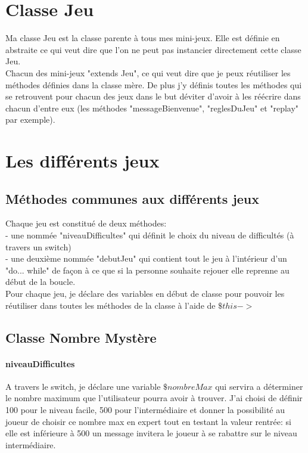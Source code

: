 \documentclass[10pt]{report}
\begin{document}
	\section{Classe Jeu}
		Ma classe Jeu est la classe parente à tous mes mini-jeux. Elle est définie en abstraite ce qui veut dire que l'on ne peut pas instancier directement cette classe Jeu.\\

		Chacun des mini-jeux "extends Jeu", ce qui veut dire que je peux réutiliser les méthodes définies dans la classe mère. De plus j'y définis toutes les méthodes qui se retrouvent pour chacun des jeux dans le but déviter d'avoir à les réécrire dans chacun d'entre eux (les méthodes "messageBienvenue", "reglesDuJeu" et "replay" par exemple).




	\section{Les différents jeux}
		\subsection{Méthodes communes aux différents jeux}
			Chaque jeu est constitué de deux méthodes:\\
			- une nommée "niveauDifficultes" qui définit le choix du niveau de difficultés (à travers un switch)\\
			- une deuxième nommée "debutJeu" qui contient tout le jeu à l'intérieur d'un "do... while" de façon à ce que si la personne souhaite rejouer elle reprenne au début de la boucle.\\
			Pour chaque jeu, je déclare des variables en début de classe pour pouvoir les réutiliser dans toutes les méthodes de la classe à l'aide de $\$this->$



		\subsection{Classe Nombre Mystère}
			\paragraph{niveauDifficultes\\}
			A travers le switch, je déclare une variable $\$nombreMax$ qui servira a déterminer le nombre maximum que l'utilisateur pourra avoir à trouver. J'ai choisi de définir 100 pour le niveau facile, 500 pour l'intermédiaire et donner la possibilité au joueur de choisir ce nombre max en expert tout en testant la valeur rentrée: si elle est inférieure à 500 un message invitera le joueur à se rabattre sur le niveau intermédiaire.
\end{document}
